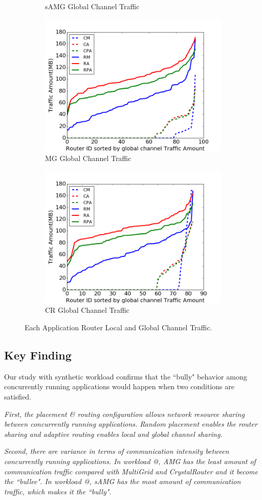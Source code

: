 \documentclass[conference,compsoc]{IEEEtran}
\makeatletter
\newcommand{\Rmnum}[1]{\expandafter\@slowromancap\romannumeral #1@}
\makeatother
\begin{document}
\begin{figure}[t]
\begin{subfigure}[t]{0.32\textwidth}
        \caption{sAMG Global Channel Traffic}
        \label{fig:syn-samg-gc-traffic}
    \end{subfigure}\hfill
    \hspace{1em}%
    \begin{subfigure}[t]{0.32\textwidth}
        \centering
        \includegraphics[height=1.5 in]{syn-wkld/mg/gc-traffic}
        \caption{MG Global Channel Traffic}
        \label{fig:syn-mg-gc-traffic}
    \end{subfigure}\hfill
    \begin{subfigure}[t]{0.32\textwidth}
        \centering
        \includegraphics[height=1.5 in]{syn-wkld/cr/gc-traffic}
        \caption{CR Global Channel Traffic}
        \label{fig:syn-cr-gc-traffic}
    \end{subfigure}%
   \caption{Each Application Router Local and Global Channel Traffic.}
   \label{fig:syn-3app-gc-traffic}
\end{figure}


\subsection{Key Finding}
Our study with synthetic workload confirms that the ``bully" behavior among concurrently running applications would happen when two conditions are satisfied.

\emph{First, the placement \& routing configuration allows network resource sharing between concurrently running applications. Random placement enables the router sharing and adaptive routing enables local and global channel sharing.}

\emph{Second, there are variance in terms of communication intensity between concurrently running applications. In workload \Rmnum{1}, AMG has the least amount of communication traffic compared with MultiGrid and CrystalRouter and it become the ``bullee". In workload \Rmnum{2}, sAMG has the most amount of communication traffic, which makes it the ``bully". }
\end{document}
